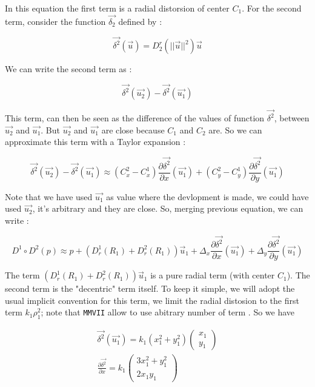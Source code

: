 In this equation the first term is a radial distorsion of center $C_1$. For the second term,
consider the function $\vec{\delta_2}$ defined by :

\begin{equation}
	\vec{\delta^2}(\vec{u}) =  D^r_2(||\vec{u}||^2) \vec{u}
\end{equation}

We can write the second term as :

\begin{equation}
	\vec{\delta^2}(\vec{u_2})  - \vec{\delta^2}(\vec{u_1})
\end{equation}

This term, can then be seen as the difference of the values of function $\vec{\delta^2}$, between $\vec{u_2}$
and $\vec{u_1}$.  But $\vec{u_2}$ and $\vec{u_1}$ are close because
$C_1$ and $C_2$ are. So we can approximate this term with  a Taylor expansion :

\begin{equation}
	\vec{\delta^2}(\vec{u_2})  - \vec{\delta^2}(\vec{u_1})
	\approx
	(C^2_x - C^1_x) \frac{\partial{\vec{\delta^2}}}{\partial x} (\vec{u_1})
     + 	(C^2_y - C^1_y) \frac{\partial{\vec{\delta^2}}}{\partial y}  (\vec{u_1})
\end{equation}

Note that we have used $\vec{u_1}$ as value where the devlopment is made, we could have used $\vec{u_2}$,
it's arbitrary and they are close.
So, merging previous equation, we can write :

\begin{equation}
	D^1 \circ D^2 (p) 
	\approx
	  p +    (D^1_r(R_1) + D^2_r(R_1))  \vec{u}_1  
	  +  \Delta_x \frac{\partial{\vec{\delta^2}}}{\partial x} (\vec{u_1})
          +  \Delta_y \frac{\partial{\vec{\delta^2}}}{\partial y}  (\vec{u_1})
\end{equation}

The term $(D^1_r(R_1) + D^2_r(R_1))  \vec{u}_1 $ is a pure radial term 
(with center $C_1$).    The second term is the "decentric" term itself.
To keep it simple, we will adopt the usual implicit convention for this term,
we limit the radial distosion to the first term $k_1 \rho_1^2$; note that {\tt MMVII} allow to use 
abitrary number of term .  So we have

\begin{equation}
\begin{multlined}
	\vec{\delta^2} (\vec{u_1}) = k_1(x_1^2+y_1^2)  \begin{pmatrix} x_1  \\ y_1 \end{pmatrix} \\
%
		\frac{\partial{\vec{\delta^2}}}{\partial x} 
		=  k_1 \begin{pmatrix} 3 x_1^2 + y_1^2    \\ 2 x_1 y_1  \end{pmatrix}
\end{multlined}
\end{equation}


